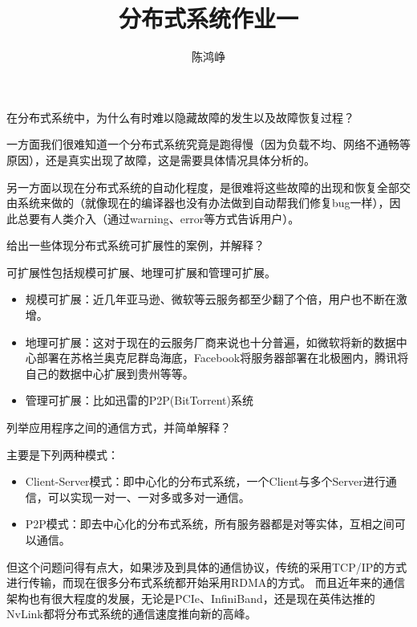 \documentclass[logo,reportComp]{thesis}
\title{分布式系统作业一}
\subtitle{}
\author{陈鸿峥}
\begin{document}
\maketitle

\begin{question}
在分布式系统中，为什么有时难以隐藏故障的发生以及故障恢复过程？
\end{question}
\begin{answer}
一方面我们很难知道一个分布式系统究竟是跑得慢（因为负载不均、网络不通畅等原因），还是真实出现了故障，这是需要具体情况具体分析的。

另一方面以现在分布式系统的自动化程度，是很难将这些故障的出现和恢复全部交由系统来做的（就像现在的编译器也没有办法做到自动帮我们修复bug一样），因此总要有人类介入（通过warning、error等方式告诉用户）。
\end{answer}

\begin{question}
给出一些体现分布式系统可扩展性的案例，并解释？
\end{question}
\begin{answer}
可扩展性包括规模可扩展、地理可扩展和管理可扩展。
\begin{itemize}
	\item 规模可扩展：近几年亚马逊\cite{bib:aws}、微软\cite{bib:azure}等云服务都至少翻了个倍，用户也不断在激增。
	\item 地理可扩展：这对于现在的云服务厂商来说也十分普遍，如微软将新的数据中心部署在苏格兰奥克尼群岛海底，Facebook将服务器部署在北极圈内，腾讯将自己的数据中心扩展到贵州\cite{bib:geo}等等。
	\item 管理可扩展：比如迅雷的P2P(BitTorrent)\cite{bib:xunlei}系统
\end{itemize}
\end{answer}

\begin{question}
列举应用程序之间的通信方式，并简单解释？
\end{question}
\begin{answer}
主要是下列两种模式：
\begin{itemize}
	\item Client-Server模式：即中心化的分布式系统，一个Client与多个Server进行通信，可以实现一对一、一对多或多对一通信。
	\item P2P模式：即去中心化的分布式系统，所有服务器都是对等实体，互相之间可以通信。
\end{itemize}
但这个问题问得有点大，如果涉及到具体的通信协议，传统的采用TCP/IP的方式进行传输，而现在很多分布式系统都开始采用RDMA\cite{bib:rdma}的方式。
而且近年来的通信架构也有很大程度的发展，无论是PCIe\cite{bib:pcie}、InfiniBand\cite{bib:infiniband}，还是现在英伟达推的NvLink\cite{bib:nvlink}都将分布式系统的通信速度推向新的高峰。
\end{answer}
\end{document}
